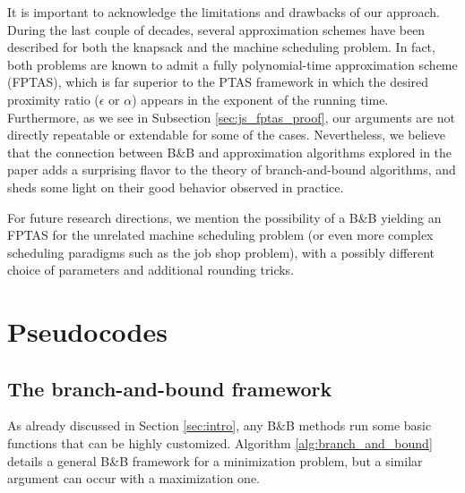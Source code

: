 \documentclass[a4paper,UKenglish,cleveref, autoref, thm-restate, pdfa]{lipics-v2021}
\theoremstyle{plain}
\begin{document}
\bigskip

It is important to acknowledge the limitations and drawbacks of our approach. During the last couple of decades, several approximation schemes have been described for both the knapsack and the machine scheduling problem. In fact, both problems are known to admit a fully polynomial-time approximation scheme (FPTAS), which is far superior to the PTAS framework in which the desired proximity ratio ($\epsilon$ or $\alpha$) appears in the exponent of the running time. Furthermore, as we see in Subsection \ref{sec:js_fptas_proof}, our arguments are not directly repeatable or extendable for some of the cases. Nevertheless, we believe that the connection between B\&B and approximation algorithms explored in the paper adds a surprising flavor to the theory of branch-and-bound algorithms, and sheds some light on their good behavior observed in practice.

For future research directions, we mention the possibility of a B\&B yielding an FPTAS for the unrelated machine scheduling problem (or even more complex scheduling paradigms such as the job shop problem), with a possibly different choice of parameters and additional rounding tricks. 







\section{Pseudocodes}\label{app:pseudocode}

\subsection{The branch-and-bound framework}
As already discussed in Section \ref{sec:intro}, any B\&B methods run some basic functions that can be highly customized. 
Algorithm \ref{alg:branch_and_bound} details a general B\&B framework for a minimization problem, but a similar argument can occur with a maximization one. 
\end{document}
